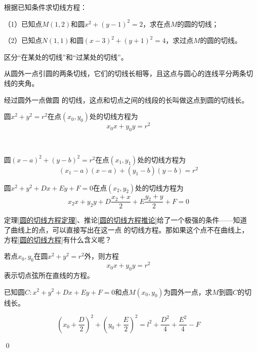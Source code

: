 \begin{example}根据已知条件求切线方程：

    （1）已知点\(M(1,2)\)和圆\(x^2+(y-1)^2=2\)，求在点\(M\)的圆的切线；

    （2）已知点\(N(1,1)\)和圆\((x-3)^2+(y+1)^2=4\)，求过点\(M\)的圆的切线。
\end{example}
区分“在某处的切线”和“过某处的切线”。
\begin{theorem}[切线长定理]
    从圆外一点引圆的两条切线，它们的切线长相等，且这点与圆心的连线平分两条切线的夹角。
    \begin{definition}[切线长]
        经过圆外一点做圆
        的切线，这点和切点之间的线段的长叫做这点到圆的切线长。
    \end{definition}
\end{theorem}
\begin{theorem}\label{圆的切线方程定理}
    圆\(x^2+y^2=r^2\)在点\((x_0,y_0)\)处的切线方程为
    \begin{equation}\label{圆的切线方程}
        x_0x+y_0y=r^2
    \end{equation}
\end{theorem}
\begin{corollary}\label{圆的切线方程推论}
    \ 

    圆\((x-a)^2+(y-b)^2=r^2\)在点\((x_1,y_1)\)处的切线方程为
    \begin{equation}
        (x_1-a)(x-a)+(y_1-b)(y-b)=r^2
    \end{equation}

    圆\(x^2+y^2+Dx+Ey+F=0\)在点\((x_2,y_2)\)处的切线方程为
    \begin{equation}
        x_2x+y_2y+D\frac{x_2+x}{2}+E\frac{y_2+y}{2}+F=0
    \end{equation}
\end{corollary}
定理\ref{圆的切线方程定理}、推论\ref{圆的切线方程推论}给了一个极强的条件——知道了曲线上的点，可以直接写出在这一点
的切线方程。那如果这个点不在曲线上，方程\ref{圆的切线方程}有什么含义呢？

\begin{theorem}
    若点\(x_0,y_0\)在圆\(x^2+y^2=r^2\)外，则方程\[x_0x+y_0y=r^2\]表示切点弦所在直线的方程。
\end{theorem}









\begin{example}
    已知圆\(C:x^2+y^2+Dx+Ey+F=0\)和点\(M(x_0,y_0)\)为圆外一点，求\(M\)到圆\(C\)的切线长。
\end{example}
\begin{jie}
    \[(x_0+\frac{D}{2})^2+(y_0+\frac{E}{2})^2=l^2+\frac{D^2}{4}+\frac{E^2}{4}-F\]

\qed
\end{jie}

